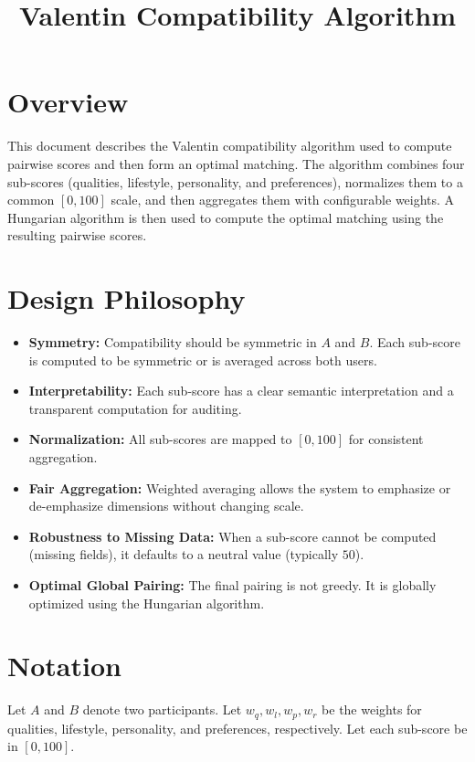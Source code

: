 \documentclass[11pt]{article}
\title{Valentin Compatibility Algorithm}
\author{}
\date{}
\begin{document}
\maketitle

\section{Overview}
This document describes the Valentin compatibility algorithm used to compute pairwise scores and then form an optimal matching. The algorithm combines four sub-scores (qualities, lifestyle, personality, and preferences), normalizes them to a common $[0,100]$ scale, and then aggregates them with configurable weights. A Hungarian algorithm is then used to compute the optimal matching using the resulting pairwise scores.

\section{Design Philosophy}
\begin{itemize}[leftmargin=*]
    \item \textbf{Symmetry:} Compatibility should be symmetric in $A$ and $B$. Each sub-score is computed to be symmetric or is averaged across both users.
    \item \textbf{Interpretability:} Each sub-score has a clear semantic interpretation and a transparent computation for auditing.
    \item \textbf{Normalization:} All sub-scores are mapped to $[0,100]$ for consistent aggregation.
    \item \textbf{Fair Aggregation:} Weighted averaging allows the system to emphasize or de-emphasize dimensions without changing scale.
    \item \textbf{Robustness to Missing Data:} When a sub-score cannot be computed (missing fields), it defaults to a neutral value (typically $50$).
    \item \textbf{Optimal Global Pairing:} The final pairing is not greedy. It is globally optimized using the Hungarian algorithm.
\end{itemize}

\section{Notation}
Let $A$ and $B$ denote two participants. Let $w_q, w_l, w_p, w_r$ be the weights for qualities, lifestyle, personality, and preferences, respectively. Let each sub-score be in $[0,100]$.
\end{document}
